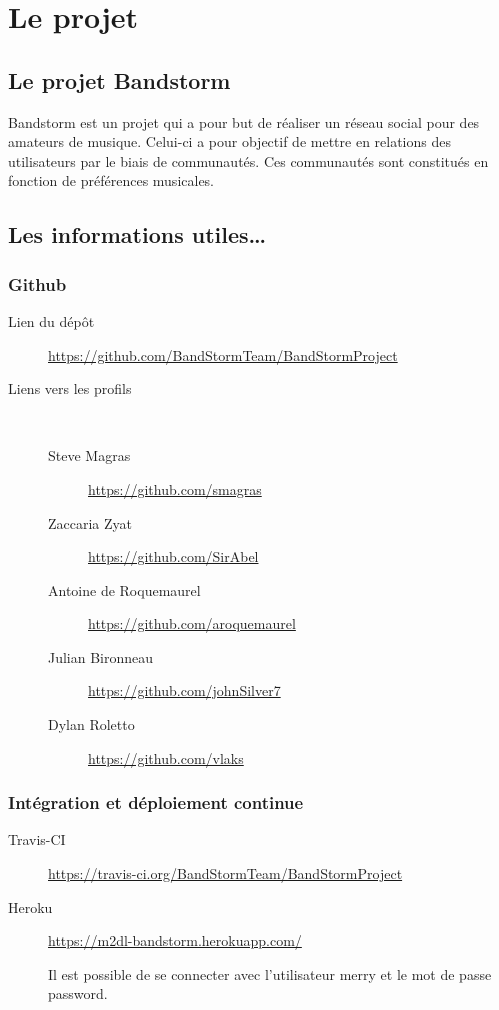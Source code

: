 \documentclass[12pt,a4paper,oneside]{book}
\begin{document}
	\thispagestyle{empty} %

	\setcounter{tocdepth}{1}
	\setcounter{secnumdepth}{3}
	\setcounter{minitocdepth}{1}
	
	\tableofcontents
	\chapter{Le projet}
	\section{Le projet Bandstorm}
	Bandstorm est un projet qui a pour but de réaliser un réseau social pour des amateurs de musique. Celui-ci a pour objectif de mettre en relations des utilisateurs par le biais de communautés. Ces communautés sont constitués en fonction de préférences musicales.

	\section{Les informations utiles\ldots}
	\subsection{Github}
	\begin{description}
		\item[Lien du dépôt] \url{https://github.com/BandStormTeam/BandStormProject}~\\
		\item[Liens vers les profils]~
			\begin{description}
				\item[Steve Magras] \url{https://github.com/smagras}
				\item[Zaccaria Zyat] \url{https://github.com/SirAbel}
				\item[Antoine de Roquemaurel] \url{https://github.com/aroquemaurel}
				\item[Julian Bironneau] \url{https://github.com/johnSilver7}
				\item[Dylan Roletto] \url{https://github.com/vlaks} 
			\end{description}
	\end{description}

	\subsection{Intégration et déploiement continue}
	\begin{description}
		\item[Travis-CI] \url{https://travis-ci.org/BandStormTeam/BandStormProject }
		\item[Heroku] \url{https://m2dl-bandstorm.herokuapp.com/}~\\
			\begin{exemple}
				Il est possible de se connecter avec l'utilisateur merry et le mot de passe password.
			\end{exemple}
	\end{description}
\end{document}
